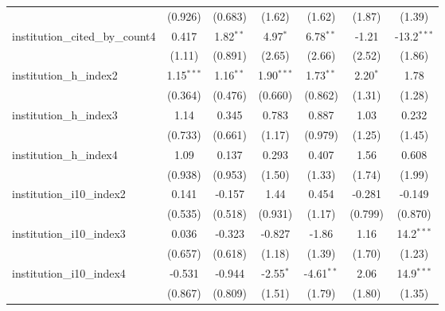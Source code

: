 \begin{tabular}{lcccccc}
                                         & (0.926)       & (0.683)       & (1.62)        & (1.62)        & (1.87)        & (1.39)\\   
   institution\_cited\_by\_count4        & 0.417         & 1.82$^{**}$   & 4.97$^{*}$    & 6.78$^{**}$   & -1.21         & -13.2$^{***}$\\   
                                         & (1.11)        & (0.891)       & (2.65)        & (2.66)        & (2.52)        & (1.86)\\   
   institution\_h\_index2                & 1.15$^{***}$  & 1.16$^{**}$   & 1.90$^{***}$  & 1.73$^{**}$   & 2.20$^{*}$    & 1.78\\   
                                         & (0.364)       & (0.476)       & (0.660)       & (0.862)       & (1.31)        & (1.28)\\   
   institution\_h\_index3                & 1.14          & 0.345         & 0.783         & 0.887         & 1.03          & 0.232\\   
                                         & (0.733)       & (0.661)       & (1.17)        & (0.979)       & (1.25)        & (1.45)\\   
   institution\_h\_index4                & 1.09          & 0.137         & 0.293         & 0.407         & 1.56          & 0.608\\   
                                         & (0.938)       & (0.953)       & (1.50)        & (1.33)        & (1.74)        & (1.99)\\   
   institution\_i10\_index2              & 0.141         & -0.157        & 1.44          & 0.454         & -0.281        & -0.149\\   
                                         & (0.535)       & (0.518)       & (0.931)       & (1.17)        & (0.799)       & (0.870)\\   
   institution\_i10\_index3              & 0.036         & -0.323        & -0.827        & -1.86         & 1.16          & 14.2$^{***}$\\   
                                         & (0.657)       & (0.618)       & (1.18)        & (1.39)        & (1.70)        & (1.23)\\   
   institution\_i10\_index4              & -0.531        & -0.944        & -2.55$^{*}$   & -4.61$^{**}$  & 2.06          & 14.9$^{***}$\\   
                                         & (0.867)       & (0.809)       & (1.51)        & (1.79)        & (1.80)        & (1.35)\\   

\end{tabular}
